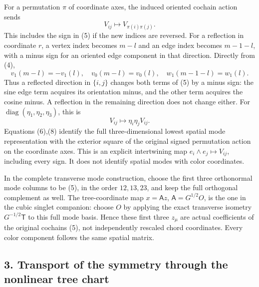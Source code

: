 \documentclass[
  11pt,
]{article}
\begin{document}
For a permutation \(\pi\) of coordinate axes, the induced oriented
cochain action sends \[
 V_{ij}\longmapsto V_{\pi(i)\pi(j)}.
 \tag{6}
\] This includes the sign in (5) if the new indices are reversed. For a
reflection in coordinate \(r\), a vertex index becomes \(m-l\) and an
edge index becomes \(m-1-l\), with a minus sign for an oriented edge
component in that direction. Directly from (4), \[
 v_1(m-l)=-v_1(l),\quad v_0(m-l)=v_0(l),\quad
 w_1(m-1-l)=w_1(l).
 \tag{7}
\] Thus a reflected direction in \(\{i,j\}\) changes both terms of (5)
by a minus sign: the sine edge term acquires its orientation minus, and
the other term acquires the cosine minus. A reflection in the remaining
direction does not change either. For
\(\operatorname{diag}(\eta_1,\eta_2,\eta_3)\), this is \[
 V_{ij}\longmapsto \eta_i\eta_j V_{ij}.
 \tag{8}
\] Equations (6),(8) identify the full three-dimensional lowest spatial
mode representation with the exterior square of the original signed
permutation action on the coordinate axes. This is an explicit
intertwining map \(e_i\wedge e_j\mapsto V_{ij}\), including every sign.
It does not identify spatial modes with color coordinates.

In the complete transverse mode construction, choose the first three
orthonormal mode columns to be (5), in the order \(12,13,23\), and keep
the full orthogonal complement as well. The tree-coordinate map
\(x=\mathsf A z\), \(\mathsf A=G^{1/2}O\), is the one in the cubic
singlet companion: choose \(O\) by applying the exact transverse
isometry \(G^{-1/2}\mathsf T\) to this full mode basis. Hence these
first three \(z_\mu\) are actual coefficients of the original cochains
(5), not independently rescaled chord coordinates. Every color component
follows the same spatial matrix.

\subsection{3. Transport of the symmetry through the nonlinear tree
chart}\label{weak-coupling-part-16-transport-of-the-symmetry-through-the-nonlinear-tree-chart}
\end{document}
